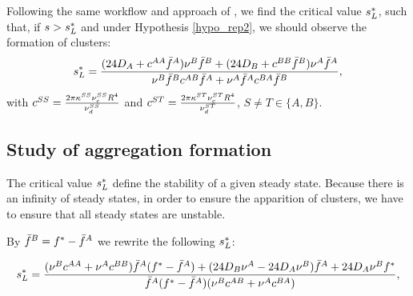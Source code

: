 Following the same workflow  and approach of \cite{twoparticule}, we find the critical value ${s^{*}_{L}}$, such that, if $s> {s^{*}_{L}}$ and under Hypothesis \ref{hypo_rep2}, we should observe the formation of clusters:
\begin{equation}
{s^{*}_{L}}=\frac{(24 D_A+{c^{AA}}{\bar{f}^A}){\nu^B}{\bar{f}^B}+(24 D_B+{c^{BB}}{\bar{f}^B}){\nu^A}{\bar{f}^A}}{{\nu^B}{\bar{f}^B}{c^{AB}}{\bar{f}^A}+{\nu^A}{\bar{f}^A}{c^{BA}}{\bar{f}^B}},
\end{equation}
with ${c^{SS}}=\frac{2\pi {\kappa^{SS}} {\nu_c^{SS}} R^{4}}{{\nu_d^{SS}}}$ and ${c^{ST}}=\frac{2\pi {\kappa^{ST}} {\nu_c^{ST}} R^{4}}{{\nu_d^{ST}}}$, $S\neq T \in \{ A,B \}$.


\subsection{Study of aggregation formation}

The critical value ${s^{*}_{L}}$ define the stability of a given steady state. Because there is an infinity of steady states, in order to ensure the apparition of clusters, we have to ensure that all steady states are unstable.

By ${\bar{f}^B}={f^{*}}-{\bar{f}^A}$ we rewrite the following ${s^{*}_{L}}$:


\begin{equation}
{s^{*}_{L}}=\frac{({\nu^B}{c^{AA}}+{\nu^A}{c^{BB}}){\bar{f}^A}({f^{*}}-{\bar{f}^A})+(24 D_B{\nu^A}-24 D_A{\nu^B}){\bar{f}^A}+24 D_A{\nu^B}{f^{*}}}{{\bar{f}^A}({f^{*}}-{\bar{f}^A})({\nu^B}{c^{AB}}+{\nu^A}{c^{BA}})},
\end{equation}

